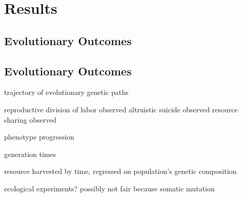\section{Results}

\subsection{Evolutionary Outcomes}



\subsection{Evolutionary Outcomes}











trajectory of evolutionary genetic paths

reproductive division of labor observed
altruistic suicide observed
resource sharing observed


phenotype progression

generation times

resource harvested by time,
  regressed on population's genetic composition

ecological experiments?
  possibly not fair because somatic mutation
